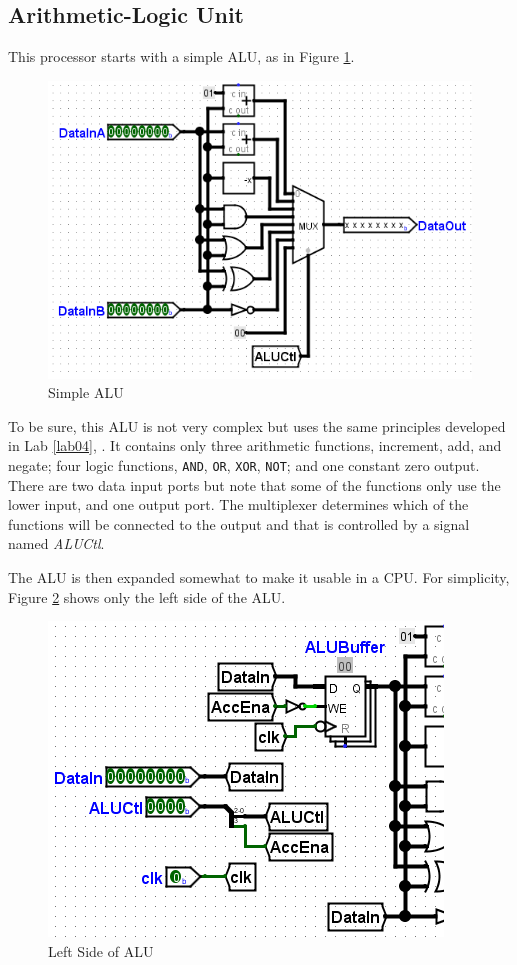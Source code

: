 \subsection{Arithmetic-Logic Unit}

This processor starts with a simple \ac{ALU}, as in Figure \ref{fig:proc-01}.

\begin{figure}[H]
	\centering
	\includegraphics[width=\maxwidth{.95\linewidth}]{gfx/proc-01}
	\caption{Simple ALU}
	\label{fig:proc-01}
\end{figure}

To be sure, this \ac{ALU} is not very complex but uses the same principles developed in Lab \ref{lab04}, . It contains only three arithmetic functions, increment, add, and negate; four logic functions, \texttt{AND}, \texttt{OR}, \texttt{XOR}, \texttt{NOT}; and one constant zero output. There are two data input ports but note that some of the functions only use the lower input, and one output port. The multiplexer determines which of the functions will be connected to the output and that is controlled by a signal named \textit{ALUCtl}.

The \ac{ALU} is then expanded somewhat to make it usable in a \ac{CPU}. For simplicity, Figure \ref{fig:proc-02} shows only the left side of the ALU.

\begin{figure}[H]
	\centering
	\includegraphics[width=\maxwidth{.95\linewidth}]{gfx/proc-02}
	\caption{Left Side of ALU}
	\label{fig:proc-02}
\end{figure}

